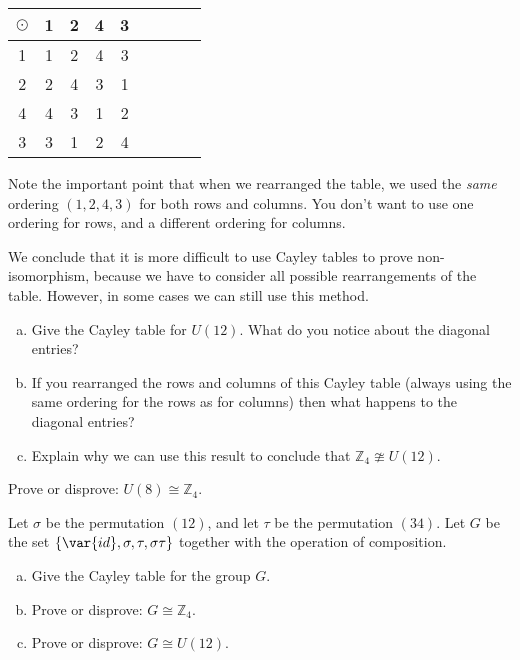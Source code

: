 \begin{example}
\begin{table}[H]
{\small
\begin{center}
\begin{tabular}{c|cccccccc}
$\odot$ & 1 & 2 & 4 & 3  \\
\hline
1        & 1 & 2 & 4 & 3  \\
2       & 2 & 4 & 3 & 1  \\
4       & 4 & 3 & 1 & 2 \\
3       & 3 & 1 & 2 & 4 \\

\end{tabular}
\end{center}
}
\end{table}

Note the important point that when we rearranged the table, we used the \emph{same} ordering $(1,2,4,3)$ for both rows and columns.   You don't want to use one ordering for rows, and a different ordering for columns.
\end{example} 
We conclude that it is more difficult to use Cayley tables to prove non-isomorphism, because we have to consider all possible rearrangements of the table. However, in some cases we can still use this method.

\begin{exercise}\label{exercise:isomorph:another_pattern}
\begin{enumerate}[(a)]
\item
Give the Cayley table for $U(12)$. What do you notice about the diagonal entries?
\item
If you rearranged the rows and columns of this Cayley table (always using the same ordering for the rows as for columns) then what happens to the diagonal entries?
\item
Explain why we can use this result to conclude that ${\mathbb Z}_4 \ncong U(12)$.
\end{enumerate}
\end{exercise} 

\begin{exercise}\label{exercise:isomorph:iso_prac5}
Prove or disprove: $U(8) \cong {\mathbb Z}_4$.
\end{exercise}
  
\begin{exercise}\label{exercise:isomorph:iso_prac6}
Let $\sigma$ be the permutation $(12)$, and let $\tau$ be the permutation $(34)$.
Let $G$ be the set $\{ \var{id}, \sigma, \tau, \sigma\tau \}$ together with the operation of composition.
\begin{enumerate}[(a)]
\item
Give the Cayley table for the group $G$.
\item
Prove or disprove: $G \cong {\mathbb Z}_4$.
\item
Prove or disprove: $G \cong U(12)$.
\end{enumerate}
\end{exercise}



